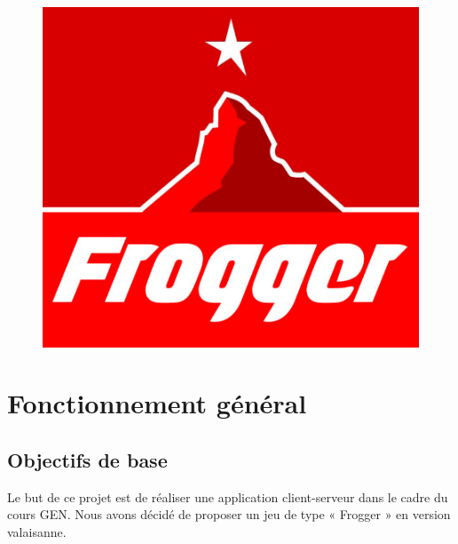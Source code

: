 \documentclass[a4paper,11pt]{article}
\author{\auteur}
\title{\titre}
\date{\today}
\begin{document}
\clearpage\maketitle
\thispagestyle{empty}

	\maketitle
	\begin{figure}[h!]
		\centering
		\includegraphics[scale=0.7]{../Logo/logo.jpg}
	\end{figure}
	\newpage


	\tableofcontents
	\listoffigures
	\listoftables

	\newpage

	\section{Fonctionnement général}
	\subsection{Objectifs de base}
	Le but de ce projet est de réaliser une application client-serveur dans le cadre du cours GEN. Nous avons décidé de proposer un jeu de type « Frogger » en version valaisanne. \par
\end{document}
